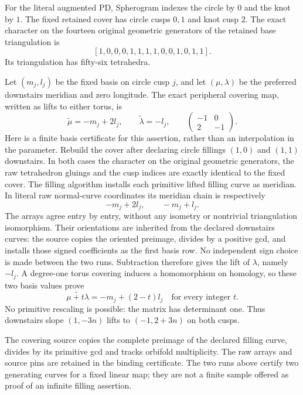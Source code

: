 \documentclass[11pt]{article}
\begin{document}
For the literal augmented PD, Spherogram indexes the circle by $0$
and the knot by $1$. The fixed retained cover has circle cusps $0,1$
and knot cusp $2$. The exact character on the fourteen original
geometric generators of the retained base triangulation is
\[
                [1,0,0,0,1,1,1,1,0,0,1,0,1,1].
\]
Its triangulation has fifty-six tetrahedra.

Let $(m_j,l_j)$ be the fixed basis on circle cusp $j$, and let
$(\mu,\lambda)$ be the preferred downstairs meridian and zero longitude.
The exact peripheral covering map, written as lifts to either torus,
is
\begin{equation}\label{eq:matrix}
 \widetilde\mu=-m_j+2l_j,\qquad
 \widetilde\lambda=-l_j,\qquad
 \begin{pmatrix}-1&0\\2&-1\end{pmatrix}.
\end{equation}
Here is a finite basis certificate for this assertion, rather than
an interpolation in the parameter. Rebuild the cover after declaring
circle fillings $(1,0)$ and $(1,1)$ downstairs. In both cases the
character on the original geometric generators, the raw tetrahedron
gluings and the cusp indices are exactly identical to the fixed cover.
The filling algorithm installs each primitive lifted filling curve as
meridian. In literal raw normal-curve coordinates its meridian chain
is respectively
\[
                   -m_j+2l_j,\qquad -m_j+l_j.
\]
The arrays agree entry by entry, without any isometry or nontrivial
triangulation isomorphism. Their orientations are inherited from the
declared downstairs curves: the source copies the oriented preimage,
divides by a positive gcd, and installs those signed coefficients as
the first basis row. No independent sign choice is made between the
two runs. Subtraction therefore gives the lift of $\lambda$,
namely $-l_j$. A degree-one torus covering induces a homomorphism
on homology, so these two basis values prove
\[
        \widetilde{\mu+t\lambda}=-m_j+(2-t)l_j
             \quad\text{for every integer }t.
\]
No primitive rescaling is possible: the matrix has determinant one.
Thus downstairs slope $(1,-3n)$ lifts to $(-1,2+3n)$ on both cusps.

The covering source copies the complete preimage of the declared
filling curve, divides by its primitive gcd and tracks orbifold
multiplicity. The raw arrays and source pins are retained in the
binding certificate. The two runs above certify two generating
curves for a fixed linear map; they are not a finite sample offered
as proof of an infinite filling assertion.
\end{document}
